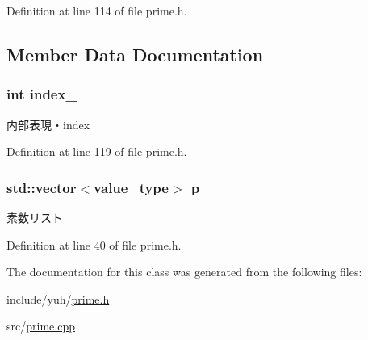 \-Definition at line 114 of file prime.\-h.



\subsection{\-Member \-Data \-Documentation}
\hypertarget{classyuh_1_1range__detail_1_1prime__iterator_aaaf1ac02dfa554a3cdffc647d512a77b}{
\subsubsection[{index\-\_\-}]{\setlength{\rightskip}{0pt plus 5cm}int {\bf index\-\_\-}}}\label{d9/dc8/classyuh_1_1range__detail_1_1prime__iterator_aaaf1ac02dfa554a3cdffc647d512a77b}
内部表現・index 

\-Definition at line 119 of file prime.\-h.

\hypertarget{classyuh_1_1range__detail_1_1prime__iterator_aff6d0a0fbc14123c0fca5a0c05d2e68c}{
\subsubsection[{p\-\_\-}]{\setlength{\rightskip}{0pt plus 5cm}std\-::vector$<${\bf value\-\_\-type}$>$ {\bf p\-\_\-}}}\label{d9/dc8/classyuh_1_1range__detail_1_1prime__iterator_aff6d0a0fbc14123c0fca5a0c05d2e68c}
素数リスト 

\-Definition at line 40 of file prime.\-h.



\-The documentation for this class was generated from the following files\-:\begin{DoxyCompactItemize}
\item 
include/yuh/\hyperlink{prime_8h}{prime.\-h}\item 
src/\hyperlink{prime_8cpp}{prime.\-cpp}\end{DoxyCompactItemize}
